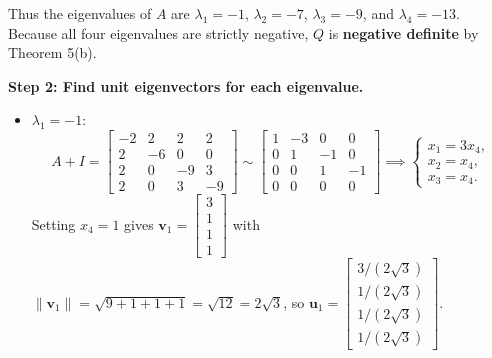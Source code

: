 \documentclass[11pt, letterpaper]{article}
\theoremstyle{definition}
\theoremstyle{remark}
\begin{document}
Thus the eigenvalues of $A$ are $\lambda_1 = -1$, $\lambda_2 = -7$, $\lambda_3 = -9$, and $\lambda_4 = -13$. Because all four eigenvalues are strictly negative, $Q$ is \textbf{negative definite} by Theorem 5(b).

\textbf{Step 2: Find unit eigenvectors for each eigenvalue.}
\begin{itemize}
    \item $\lambda_1 = -1$:
    \[
    A + I = \begin{bmatrix} -2 & 2 & 2 & 2 \\ 2 & -6 & 0 & 0 \\ 2 & 0 & -9 & 3 \\ 2 & 0 & 3 & -9 \end{bmatrix} \sim \begin{bmatrix} 1 & -3 & 0 & 0 \\ 0 & 1 & -1 & 0 \\ 0 & 0 & 1 & -1 \\ 0 & 0 & 0 & 0 \end{bmatrix} \implies \begin{cases} x_1 = 3x_4, \\ x_2 = x_4, \\ x_3 = x_4. \end{cases}
    \]
    Setting $x_4 = 1$ gives $\mathbf{v}_1 = \begin{bmatrix} 3 \\ 1 \\ 1 \\ 1 \end{bmatrix}$ with $\|\mathbf{v}_1\| = \sqrt{9 + 1 + 1 + 1} = \sqrt{12} = 2\sqrt{3}$, so $\mathbf{u}_1 = \begin{bmatrix} 3/(2\sqrt{3}) \\ 1/(2\sqrt{3}) \\ 1/(2\sqrt{3}) \\ 1/(2\sqrt{3}) \end{bmatrix}$.


\end{itemize}
\end{document}
